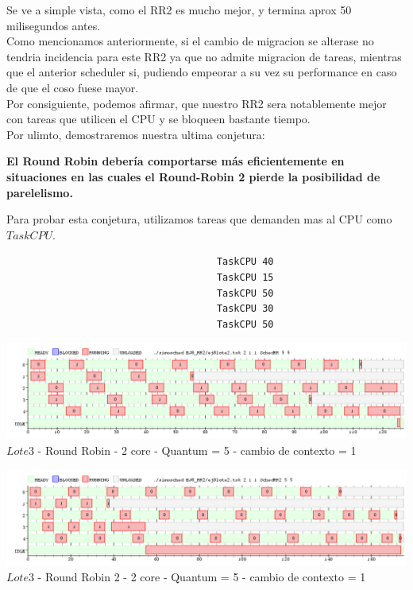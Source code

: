  \indent Se ve a simple vista, como el RR2 es mucho mejor, y termina aprox 50 milisegundos antes.\\
 Como mencionamos anteriormente, si el cambio de migracion se alterase no tendria incidencia para este RR2 ya que 
 no admite migracion de tareas, mientras que el anterior scheduler si, pudiendo empeorar a su vez su performance en caso
 de que el coso fuese mayor.\\
 
 \indent Por consiguiente, podemos afirmar, que nuestro RR2 sera notablemente mejor con tareas que utilicen el CPU y se bloqueen
 bastante tiempo.\\
 
 \indent Por ulimto, demostraremos nuestra ultima conjetura: 
 
  \begin{center}
   \textbf{El Round Robin debería comportarse más eficientemente en situaciones en
   las cuales el Round-Robin 2 pierde la posibilidad de parelelismo.}
  \end{center}
  
  \indent Para probar esta conjetura, utilizamos tareas que demanden mas al CPU como $TaskCPU$.\\
  
\begin{verbatim}
                                     TaskCPU 40
                                     TaskCPU 15
                                     TaskCPU 50
                                     TaskCPU 30
                                     TaskCPU 50
\end{verbatim}

\begin{center}
    	\includegraphics[width=450pt]{./EJ8_RR2/dif10corerr.png}
	{$Lote 3$ - Round Robin - 2 core - Quantum = 5 - cambio de contexto = 1}	
 \end{center}
 
 \begin{center}
    	\includegraphics[width=450pt]{./EJ8_RR2/dif10corerr2.png}
	{$Lote 3$ - Round Robin 2 - 2 core - Quantum = 5 - cambio de contexto = 1}	
 \end{center}

